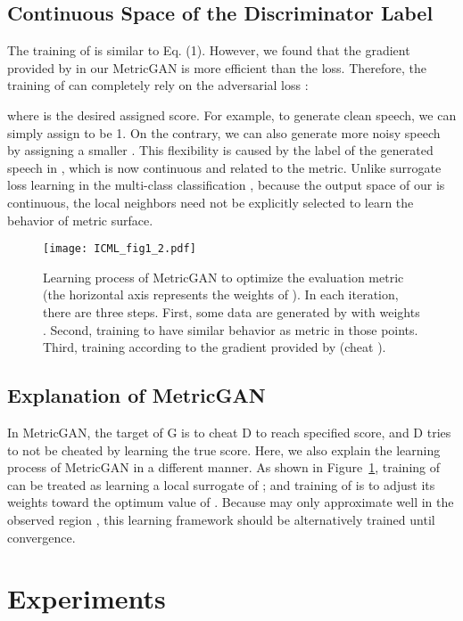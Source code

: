 \documentclass{article}
\begin{document}
\subsection{Continuous Space of the Discriminator Label}
The training of  is similar to Eq. (1). However, we found that the gradient provided by  in our MetricGAN is more efficient than the  loss. Therefore, the training of  can completely rely on the adversarial loss :


where  is the desired assigned score. For example, to generate clean speech, we can simply assign  to be 1. On the contrary, we can also generate more noisy speech by assigning a smaller . This flexibility is caused by the label of the generated speech in , which is now continuous and related to the metric. Unlike surrogate loss learning in the multi-class classification \cite{hsieh2018deep}, because the output space of our  is continuous, the local neighbors need not be explicitly selected to learn the behavior of metric surface.


\begin{figure}[ht]
\vskip 0.1in
\begin{center}
\centerline{\texttt{[image: ICML\_fig1\_2.pdf]}}
\vskip -0.1in
\caption{Learning process of MetricGAN to optimize the evaluation metric  (the horizontal axis represents the weights of ). In each iteration, there are three steps. First, some data are generated by  with weights . Second, training  to have similar behavior as metric  in those points. Third, training  according to the gradient provided by  (cheat ).}
\label{fig:MetricGAN_explain}
\end{center}
\vskip -0.2in
\end{figure}

\subsection{Explanation of MetricGAN}
In MetricGAN, the target of G is to cheat D to reach specified score, and D tries to not be cheated by learning the true score. Here, we also explain the learning process of MetricGAN in a different manner. As shown in Figure~\ref{fig:MetricGAN_explain}, training of  can be treated as learning a local surrogate of ; and training of  is to adjust its weights  toward the optimum value of . Because  may only approximate  well in the observed region \cite{fu2019learning}, this learning framework should be alternatively trained until convergence. 

\section{Experiments}
\end{document}

